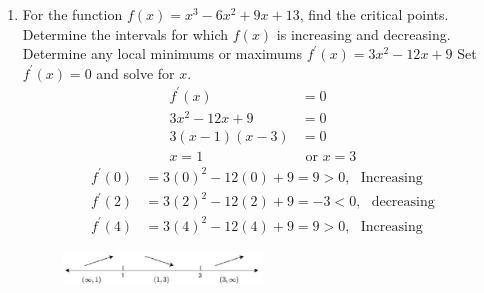 \documentclass{exam}
\begin{document}
\begin{enumerate}
\newpage
\item For the function $f(x)=x^{3}-6x^{2}+9x+13$, find the critical points. Determine the intervals for which $f(x)$ is increasing and decreasing. Determine any local minimums or maximums
  $f^{\prime}(x)=3x^{2}-12x+9$
   Set $f^{\prime}(x)=0$ and solve for $x$.
\begin{align*}
                   f^{\prime}(x)& = 0\\
                  3x^{2}-12x+9 & = 0\\
            3(x-1)(x-3) & = 0\\
                     x=1 & \text{ or } x=3
\end{align*}
\begin{align*}
 f^{\prime}(0)& = 3(0)^{2}-12(0)+9=9>0, \ \ \ \text{Increasing}\\
f^{\prime}(2)& = 3(2)^{2}-12(2)+9=-3<0, \ \ \ \text{decreasing}\\
f^{\prime}(4)& = 3(4)^{2}-12(4)+9=9>0, \ \ \  \text{Increasing}
\end{align*} 
\begin{figure}[H]
\centering
\includegraphics[width=0.5\textwidth]{Diagram_P15.eps}
\end{figure}


\end{enumerate}
\end{document}
